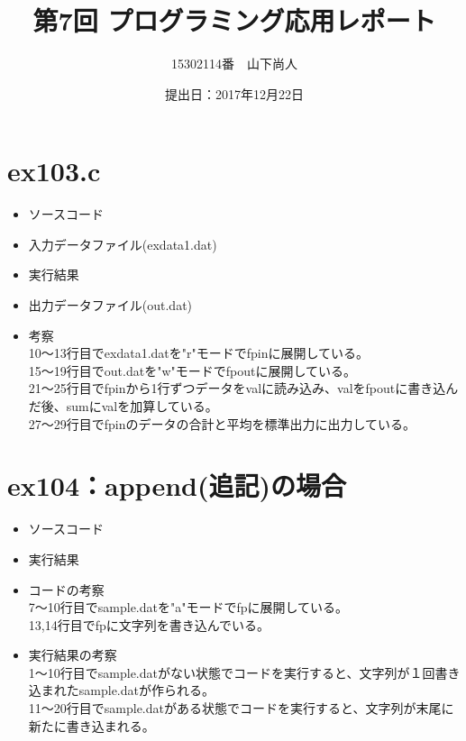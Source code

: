 \documentclass[a4paper]{jsarticle}
\title{第7回 プログラミング応用レポート}
\author{15302114番　山下尚人}
\date{提出日：2017年12月22日}
\begin{document}
\maketitle%

\section{ex103.c}
	\begin{itemize}
	\item ソースコード
		 
		\mbox{}\newline
	\item 入力データファイル(exdata1.dat)
		 
		\mbox{}\newline
	\item 実行結果
		 
		\mbox{}\newline
	\item 出力データファイル(out.dat)
		 
		\mbox{}\newline
	\item 考察\mbox{}\\
		10〜13行目でexdata1.datを"r"モードでfpinに展開している。\\
		15〜19行目でout.datを"w"モードでfpoutに展開している。\\
		21〜25行目でfpinから1行ずつデータをvalに読み込み、valをfpoutに書き込んだ後、sumにvalを加算している。\\
		27〜29行目でfpinのデータの合計と平均を標準出力に出力している。
	\end{itemize}

\section{ex104：append(追記)の場合}
	\begin{itemize}
	\item ソースコード
		 
		\mbox{}\newline
	\item 実行結果
		 
		\mbox{}\newline
	\item コードの考察\mbox{}\\
		7〜10行目でsample.datを"a"モードでfpに展開している。\\
		13,14行目でfpに文字列を書き込んでいる。
	\item 実行結果の考察\mbox{}\\
		1〜10行目でsample.datがない状態でコードを実行すると、文字列が１回書き込まれたsample.datが作られる。\\
		11〜20行目でsample.datがある状態でコードを実行すると、文字列が末尾に新たに書き込まれる。
	\end{itemize}
\end{document}
